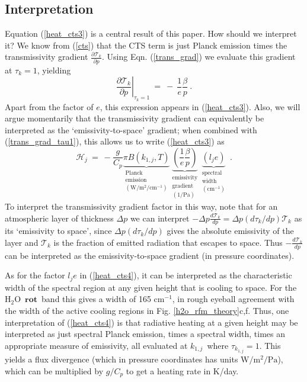 \documentclass{ametsoc}
\newcommand{\beqn}{\begin{equation}}
\newcommand{\eeqn}{\end{equation}}
\newcommand{\eqnref}[1]{(\ref{#1})}
\newcommand{\Wmsq}{\ensuremath{\mathrm{W/m^2}}}
\newcommand{\cminverse}{\ensuremath{\mathrm{cm^{-1}}}}
\newcommand{\Pa}{\ensuremath{\mathrm{Pa}}}
\newcommand{\der}[2]{\ensuremath{\frac{d #1}{d #2}}}
\newcommand{\partialder}[2]{\ensuremath{\frac{\partial #1}{\partial #2}}}
\newcommand{\Cp}{\ensuremath{C_p}}
\newcommand{\htwo}{\ensuremath{\mathrm{H_2O}}}
\newcommand{\trans}{\ensuremath{\mathcal{T}}}
\newcommand{\ch}{\ensuremath{\mathcal{H}}}
\newcommand{\lj}{\ensuremath{l_j}}
\newcommand{\tauk}{\ensuremath{\tau_k}}
\newcommand{\konej}{\ensuremath{k_{1,j}}}
\newcommand{\rot}{\ensuremath{\mathbf{rot}}}
\begin{document}
\subsection{Interpretation}
Equation \eqnref{heat_cts3} is a central result of this paper. How should we interpret it? We know from \eqnref{cts} that the CTS term is just Planck emission times the transmissivity gradient $\partialder{\trans_k}{p}$. Using Eqn. \eqnref{trans_grad} we evaluate this gradient at  $\tauk=1$, yielding
\beqn
	\left. \partialder{\trans_k}{p} \right |_{\tauk=1}  \ =  \ -\ \frac{1}{e}\frac{\beta}{p} \ .
	\label{trans_grad_tau1}
\eeqn
Apart from the factor of $e$, this expression appears in \eqnref{heat_cts3}. Also, we will argue momentarily  that the transmissivity gradient can equivalently be interpreted as  the  `emissivity-to-space' gradient; when combined with \eqnref{trans_grad_tau1}, this allows us to write \eqnref{heat_cts3} as 
	\beqn
		\ch_j \ = \ -\frac{g}{\Cp} \underbrace{\pi B(\konej,T)}_{\substack{ \text{Planck } \\ \text{emission}\\(\Wmsq/\cminverse) } }
					   \underbrace{\left(\frac{1}{e}\frac{\beta}{p}\right)}_{\substack{ \text{emissivity} \\ \text{gradient}  \\ (1/\Pa) } } 
					   \underbrace{(\lj e)}_{\substack{  \text{spectral} \\ \text{width} \\ (\cminverse) } }    \; .
		\label{heat_cts4}
	\eeqn
 To interpret the transmissivity gradient factor in this way, note that for an atmospheric layer of thickness $\Delta p$ we can interpret $-\Delta p\der{\trans_k}{p}  = \Delta p (d \tauk/dp)\trans_k$ as its `emissivity to space', since $\Delta p(d \tauk/dp)$ gives the absolute  emissivity of the layer and $\trans_k$ is the fraction of emitted radiation that escapes to space. Thus $-\der{\trans_k}{p}$ can be interpreted as the emissivity-to-space gradient (in pressure coordinates). 

As for the factor $\lj e$ in \eqnref{heat_cts4}, it can be interpreted as the characteristic  width of the spectral region at any given height that is cooling to space. For the \htwo\ \rot\ band this gives a width of 165 \cminverse,  in rough eyeball agreement with the width of the active cooling regions in Fig. \ref{h2o_rfm_theory}c,f.  Thus, one interpretation of  \eqnref{heat_cts4} is that radiative heating at a given height  may be interpreted as just spectral Planck emission, times a spectral width,  times an appropriate measure of emissivity,  all evaluated at \konej\ where $\tau_{\konej}=1$. This yields a flux divergence (which in pressure coordinates has units $\Wmsq/\Pa$), which can be multiplied by $g/\Cp$ to get a heating rate in K/day.
 
\end{document}
